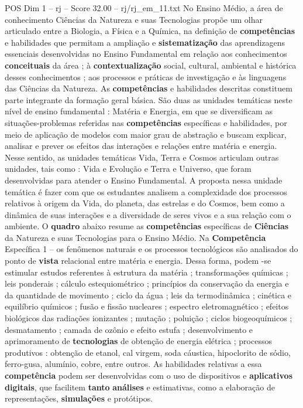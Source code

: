 \begin{textsample}{POS Dim 1 – rj – Score 32.00 – rj/rj\_em\_11.txt}
No Ensino Médio, a área de conhecimento Ciências da Natureza e suas Tecnologias propõe um olhar articulado entre a Biologia, a Física e a Química, na definição de \textbf{competências} e habilidades que permitam a ampliação e \textbf{sistematização} das aprendizagens essenciais desenvolvidas no Ensino Fundamental em relação aos conhecimentos \textbf{conceituais} da área ; à \textbf{contextualização} social, cultural, ambiental e histórica desses conhecimentos ; aos processos e práticas de investigação e às linguagens das Ciências da Natureza.
As \textbf{competências} e habilidades descritas constituem parte integrante da formação geral básica.
São duas as unidades temáticas neste nível de ensino fundamental : Matéria e Energia, em que se diversificam as situações-problemas referidas nas \textbf{competências} específicas e habilidades, por meio de aplicação de modelos com maior grau de abstração e buscam explicar, analisar e prever os efeitos das interações e relações entre matéria e energia.
Nesse sentido, as unidades temáticas Vida, Terra e Cosmos articulam outras unidades, tais como : Vida e Evolução e Terra e Universo, que foram desenvolvidas para atender o Ensino Fundamental.
A proposta nessa unidade temática é fazer com que os estudantes analisem a complexidade dos processos relativos à origem da Vida, do planeta, das estrelas e do Cosmos, bem como a dinâmica de suas interações e a diversidade de seres vivos e a sua relação com o ambiente.
O \textbf{quadro} abaixo resume as \textbf{competências} específicas de \textbf{Ciências} da Natureza e suas Tecnologias para o Ensino Médio.
Na \textbf{Competência} Específica 1 – os fenômenos naturais e os processos tecnológicos são analisados do ponto de \textbf{vista} relacional entre matéria e energia.
Dessa forma, podem -se estimular estudos referentes à estrutura da matéria ; transformações químicas ; leis ponderais ; cálculo estequiométrico ; princípios da conservação da energia e da quantidade de movimento ; ciclo da água ; leis da termodinâmica ; cinética e equilíbrio químicos ; fusão e fissão nucleares ; espectro eletromagnético ; efeitos biológicos das radiações ionizantes ; mutação ; poluição ; ciclos biogeoquímicos ; desmatamento ; camada de ozônio e efeito estufa ; desenvolvimento e aprimoramento de \textbf{tecnologias} de obtenção de energia elétrica ; processos produtivos : obtenção de etanol, cal virgem, soda cáustica, hipoclorito de sódio, ferro-gusa, alumínio, cobre, entre outros.
As habilidades relativas a essa \textbf{competência} podem ser desenvolvidas com o uso de dispositivos e \textbf{aplicativos} \textbf{digitais}, que facilitem \textbf{tanto} \textbf{análises} e estimativas, como a elaboração de representações, \textbf{simulações} e protótipos.

\end{textsample}
